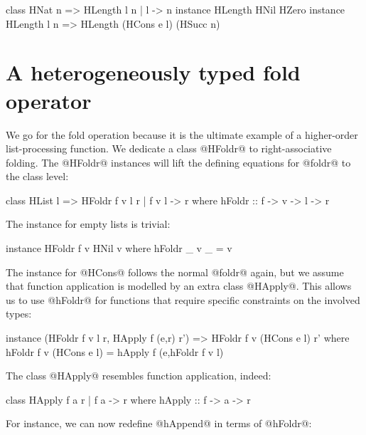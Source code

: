 \documentclass[nocopyrightspace,preprint]{sigplan-proc}
\begin{document}
\begin{code}
 class HNat n => HLength l n | l -> n  
 instance HLength HNil HZero
 instance HLength l n
       => HLength (HCons e l) (HSucc n)
\end{code}






\section{A heterogeneously typed fold operator}
\label{A:HFoldr}

We go for the fold operation because it is the ultimate example of a
higher-order list-processing function. We dedicate a class @HFoldr@ to
right-associative folding. The @HFoldr@ instances will lift the
defining equations for @foldr@ to the class level:

\begin{code}
 class HList l => HFoldr f v l r | f v l -> r
  where
   hFoldr :: f -> v -> l -> r
\end{code}

The instance for empty lists is trivial:

\begin{code}
 instance HFoldr f v HNil v
  where
   hFoldr _ v _ = v
\end{code}

The instance for @HCons@ follows the normal @foldr@ again, but we
assume that function application is modelled by an extra class
@HApply@. This allows us to use @hFoldr@ for functions that require
specific constraints on the involved types:

\begin{code}
 instance (HFoldr f v l r, HApply f (e,r) r')
       =>  HFoldr f v (HCons e l) r'
  where
   hFoldr f v (HCons e l) = hApply f (e,hFoldr f v l)
\end{code}

The class @HApply@ resembles function application, indeed:

\begin{code}
 class HApply f a r | f a -> r
 where
  hApply :: f -> a -> r
\end{code}

For instance, we can now redefine @hAppend@ in terms of @hFoldr@:
\end{document}
